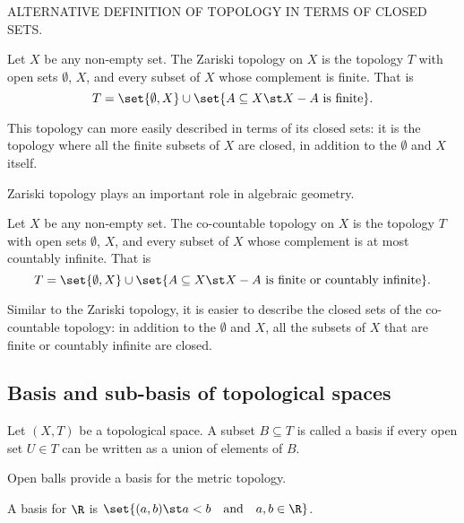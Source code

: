 ALTERNATIVE DEFINITION OF TOPOLOGY IN TERMS OF CLOSED SETS.

\begin{negg}
  Let $X$ be any non-empty set. The Zariski topology on $X$ is the topology $T$ with open sets $\emptyset$, $X$, and every subset of $X$ whose complement is finite. That is
  \begin{equation*}
    T = \set{\emptyset, X} \cup \set{A \subseteq X \st X-A\ \text{is finite}}.
  \end{equation*}

  This topology can more easily described in terms of its closed sets: it is the topology where all the finite subsets of $X$ are closed, in addition to the $\emptyset$ and $X$ itself.

  Zariski topology plays an important role in algebraic geometry.\eggqed
\end{negg}

\begin{negg}
  Let $X$ be any non-empty set. The co-countable topology on $X$ is the topology $T$ with open sets $\emptyset$, $X$, and every subset of $X$ whose complement is at most countably infinite. That is
  \begin{equation*}
    T = \set{\emptyset, X} \cup \set{A \subseteq X \st X-A\ \text{is finite or countably infinite}}.
  \end{equation*}

  Similar to the Zariski topology, it is easier to describe the closed sets of the co-countable topology: in addition to the $\emptyset$ and $X$, all the subsets of $X$ that are finite or countably infinite are closed.\eggqed
\end{negg}

\subsection{Basis and sub-basis of topological spaces}
\begin{ndfn}
  Let $(X,T)$ be a topological space. A subset $B \subseteq T$ is called a basis if every open set $U \in T$ can be written as a union of elements of $B$.
\end{ndfn}

\begin{negg}
  Open balls provide a basis for the metric topology.\eggqed
\end{negg}

\begin{negg}
  A basis for $\R$ is $\set{(a,b) \st a<b \quad\text{and}\quad a,b\in\R}$.
\end{negg}

